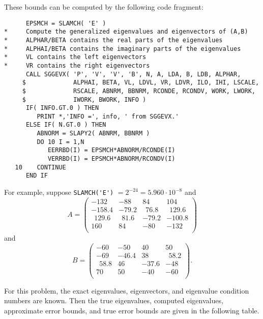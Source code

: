These bounds can be computed by the following code fragment:

\begin{verbatim}
      EPSMCH = SLAMCH( 'E' )
*     Compute the generalized eigenvalues and eigenvectors of (A,B)
*     ALPHAR/BETA contains the real parts of the eigenvalues
*     ALPHAI/BETA contains the imaginary parts of the eigenvalues
*     VL contains the left eigenvectors
*     VR contains the right eigenvectors
      CALL SGGEVX( 'P', 'V', 'V', 'B', N, A, LDA, B, LDB, ALPHAR,
     $             ALPHAI, BETA, VL, LDVL, VR, LDVR, ILO, IHI, LSCALE,
     $             RSCALE, ABNRM, BBNRM, RCONDE, RCONDV, WORK, LWORK,
     $             IWORK, BWORK, INFO )
      IF( INFO.GT.0 ) THEN
         PRINT *,'INFO =', info, ' from SGGEVX.'
      ELSE IF( N.GT.0 ) THEN
         ABNORM = SLAPY2( ABNRM, BBNRM )
         DO 10 I = 1,N
            EERRBD(I) = EPSMCH*ABNORM/RCONDE(I)
            VERRBD(I) = EPSMCH*ABNORM/RCONDV(I)
   10    CONTINUE
      END IF
\end{verbatim}

For example, suppose
\verb+SLAMCH('E')+ $ = 2^{-24} = 5.960  \cdot 10^{-8}$ and
\[
A = \left( \begin{array}{cccc}
           -132~~   &   -88~~  &    84    &    104     \\
           -158.4   &   -79.2  &  ~~76.8  &  ~~129.6   \\
          ~~129.6   &  ~~81.6  &   -79.2  &   -100.8   \\
            160     &    84    &   -80~~  &   -132~~   \\
           \end{array} \right )
\]
and
\[
B = \left( \begin{array}{cccc}
           -60~~  &  -50~~  &   40   &   50   \\
           -69~~  &  -46.4  &   38   & ~~58.2 \\
          ~~58.8  &   46    &  -37.6 &  -48~~ \\
            70    &   50    &  -40~~ &  -60~~ \\
           \end{array} \right ).
\]

For this problem, the exact eigenvalues, eigenvectors, and eigenvalue
condition numbers are known.  Then the true eigenvalues, computed eigenvalues,
approximate error bounds, and true error bounds are
given in the following table.

